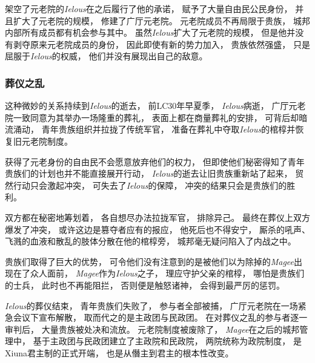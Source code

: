 \documentclass[UTF8,12pt]{ctexbook}
\begin{document}
                架空了元老院的\emph{Ielous}在之后履行了他的承诺，
                赋予了大量自由民公民身份，
                并且扩大了元老院的规模，
                修建了广厅元老院。
                元老院成员不再局限于贵族，
                城邦内部所有成员都有机会参与其中。
                虽然\emph{Ielous}扩大了元老院的规模，
                但是他并没有剥夺原来元老院成员的身份，
                因此即使有新的势力加入，
                贵族依然强盛，
                只是屈服于\emph{Ielous}的权威，
                他们并没有展现出自己的敌意。
                \subsubsection{葬仪之乱}
                这种微妙的关系持续到\emph{Ielous}的逝去，
                前LC30年早夏季，
                \emph{Ielous}病逝，
                广厅元老院一致同意为其举办一场隆重的葬礼，
                表面上都在商量葬礼的安排，
                可背后却暗流涌动，
                青年贵族组织并拉拢了传统军官，
                准备在葬礼中夺取\emph{Ielous}的棺椁并恢复旧元老院制度。

                获得了元老身份的自由民不会愿意放弃他们的权力，
                但即使他们秘密得知了青年贵族们的计划也并不能直接展开行动，
                \emph{Ielous}的逝去让旧贵族重新站了起来，
                贸然行动只会激起冲突，
                可失去了\emph{Ielous}的保障，
                冲突的结果只会是贵族们的胜利。

                双方都在秘密地筹划着，
                各自想尽办法拉拢军官，
                排除异己。
                最终在葬仪上双方爆发了冲突，
                或许这边是篡夺者应有的报应，
                他死后也不得安宁，
                厮杀的吼声、飞溅的血液和散乱的肢体分散在他的棺椁旁，
                城邦毫无疑问陷入了内战之中。

                贵族们取得了巨大的优势，
                可令他们没有注意到的是被他们以为除掉的\emph{Magee}出现在了众人面前，
                \emph{Magee}作为\emph{Ielous}之子，
                理应守护父亲的棺椁，
                哪怕是贵族们的士兵，
                此时也不再能阻拦，
                否则便是触怒诸神，
                会得到最严厉的惩罚。

                \emph{Ielous}的葬仪结束，
                青年贵族们失败了，
                参与者全部被捕，
                广厅元老院在一场紧急会议下宣布解散，
                取而代之的是主政团与民政团。
                在对葬仪之乱的参与者逐一审判后，
                大量贵族被处决和流放。
                元老院制度被废除了，
                \emph{Magee}在之后的城邦管理中，
                基于主政团与民政团建立了主政院和民政院，
                两院统称为政院制度，
                是Xiuna君主制的正式开端，
                也是从僭主到君主的根本性改变。
\end{document}
